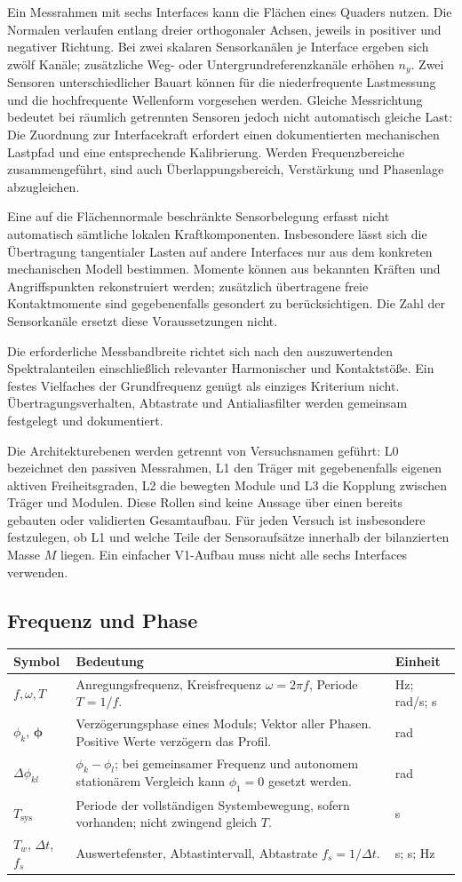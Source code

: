 \documentclass[11pt,a4paper]{article}
\makeatletter
\newenvironment{symtab}{\begin{longtable}{@{}L{.22\textwidth}L{.62\textwidth}L{.12\textwidth}@{}}\toprule\textbf{Symbol}&\textbf{Bedeutung}&\textbf{Einheit}\\\midrule\endhead}{\bottomrule\end{longtable}}
\makeatother
\begin{document}
Ein Messrahmen mit sechs Interfaces kann die Flächen eines Quaders nutzen. Die Normalen verlaufen entlang dreier orthogonaler Achsen, jeweils in positiver und negativer Richtung. Bei zwei skalaren Sensorkanälen je Interface ergeben sich zwölf Kanäle; zusätzliche Weg- oder Untergrundreferenzkanäle erhöhen $n_y$. Zwei Sensoren unterschiedlicher Bauart können für die niederfrequente Lastmessung und die hochfrequente Wellenform vorgesehen werden. Gleiche Messrichtung bedeutet bei räumlich getrennten Sensoren jedoch nicht automatisch gleiche Last: Die Zuordnung zur Interfacekraft erfordert einen dokumentierten mechanischen Lastpfad und eine entsprechende Kalibrierung. Werden Frequenzbereiche zusammengeführt, sind auch Überlappungsbereich, Verstärkung und Phasenlage abzugleichen.

Eine auf die Flächennormale beschränkte Sensorbelegung erfasst nicht automatisch sämtliche lokalen Kraftkomponenten. Insbesondere lässt sich die Übertragung tangentialer Lasten auf andere Interfaces nur aus dem konkreten mechanischen Modell bestimmen. Momente können aus bekannten Kräften und Angriffspunkten rekonstruiert werden; zusätzlich übertragene freie Kontaktmomente sind gegebenenfalls gesondert zu berücksichtigen. Die Zahl der Sensorkanäle ersetzt diese Voraussetzungen nicht.

Die erforderliche Messbandbreite richtet sich nach den auszuwertenden Spektralanteilen einschließlich relevanter Harmonischer und Kontaktstöße. Ein festes Vielfaches der Grundfrequenz genügt als einziges Kriterium nicht. Übertragungsverhalten, Abtastrate und Antialiasfilter werden gemeinsam festgelegt und dokumentiert.

Die Architekturebenen werden getrennt von Versuchsnamen geführt: L0 bezeichnet den passiven Messrahmen, L1 den Träger mit gegebenenfalls eigenen aktiven Freiheitsgraden, L2 die bewegten Module und L3 die Kopplung zwischen Träger und Modulen. Diese Rollen sind keine Aussage über einen bereits gebauten oder validierten Gesamtaufbau. Für jeden Versuch ist insbesondere festzulegen, ob L1 und welche Teile der Sensoraufsätze innerhalb der bilanzierten Masse $M$ liegen. Ein einfacher V1-Aufbau muss nicht alle sechs Interfaces verwenden.

\subsection{Frequenz und Phase}
\begin{symtab}
$f,\omega,T$&Anregungsfrequenz, Kreisfrequenz $\omega=2\pi f$, Periode $T=1/f$.&Hz; rad/s; s\\
$\phi_k$, $\boldsymbol\phi$&Verzögerungsphase eines Moduls; Vektor aller Phasen. Positive Werte verzögern das Profil.&rad\\
$\Delta\phi_{kl}$&$\phi_k-\phi_l$; bei gemeinsamer Frequenz und autonomem stationärem Vergleich kann $\phi_1=0$ gesetzt werden.&rad\\
$T_{\mathrm{sys}}$&Periode der vollständigen Systembewegung, sofern vorhanden; nicht zwingend gleich $T$.&s\\
$T_w$, $\Delta t$, $f_s$&Auswertefenster, Abtastintervall, Abtastrate $f_s=1/\Delta t$.&s; s; Hz\\
\end{symtab}
\end{document}
